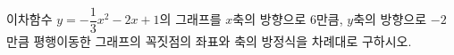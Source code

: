 이차함수 $y=-\dfrac{1}{3}x^2-2x+1$의 그래프를 $x$축의 방향으로 $6$만큼, $y$축의 방향으로 $-2$만큼 평행이동한 그래프의 꼭짓점의 좌표와 축의 방정식을 차례대로 구하시오.

